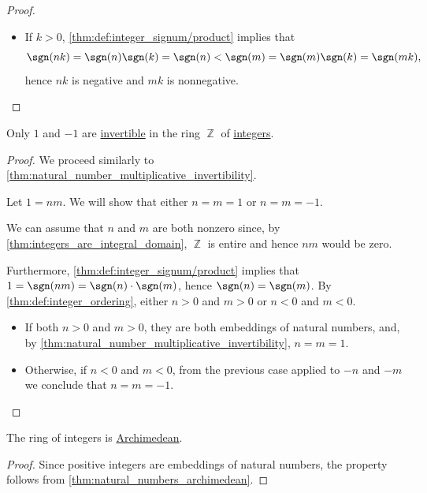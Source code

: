 \begin{proof}
\begin{itemize}
\begin{itemize}
      \item If \( k > 0 \), \cref{thm:def:integer_signum/product} implies that
      \begin{equation*}
        \sgn(nk) = \sgn(n) \sgn(k) = \sgn(n) < \sgn(m) = \sgn(m) \sgn(k) = \sgn(mk),
      \end{equation*}
      hence \( nk \) is negative and \( mk \) is nonnegative.
    \end{itemize}
  \end{itemize}
\end{proof}

\begin{corollary}\label{thm:integer_multiplicative_invertibility}
  Only \( 1 \) and \( -1 \) are \hyperref[def:semiring_divisibility/invertible]{invertible} in the ring \( \BbbZ \) of \hyperref[def:integers]{integers}.
\end{corollary}
\begin{proof}
  We proceed similarly to \cref{thm:natural_number_multiplicative_invertibility}.

  Let \( 1 = nm \). We will show that either \( n = m = 1 \) or \( n = m = -1 \).

  We can assume that \( n \) and \( m \) are both nonzero since, by \cref{thm:integers_are_integral_domain}, \( \BbbZ \) is entire and hence \( nm \) would be zero.

  Furthermore, \cref{thm:def:integer_signum/product} implies that \( 1 = \sgn(nm) = \sgn(n) \cdot \sgn(m) \), hence \( \sgn(n) = \sgn(m) \). By \cref{thm:def:integer_ordering}, either \( n > 0 \) and \( m > 0 \) or \( n < 0 \) and \( m < 0 \).

  \begin{itemize}
    \item If both \( n > 0 \) and \( m > 0 \), they are both embeddings of natural numbers, and, by \cref{thm:natural_number_multiplicative_invertibility}, \( n = m = 1 \).

    \item Otherwise, if \( n < 0 \) and \( m < 0 \), from the previous case applied to \( -n \) and \( -m \) we conclude that \( n = m = -1 \).
  \end{itemize}
\end{proof}

\begin{proposition}\label{thm:integers_archimedean}
  The ring of integers is \hyperref[def:archimedean_semiring]{Archimedean}.
\end{proposition}
\begin{proof}
  Since positive integers are embeddings of natural numbers, the property follows from \cref{thm:natural_numbers_archimedean}.
\end{proof}

